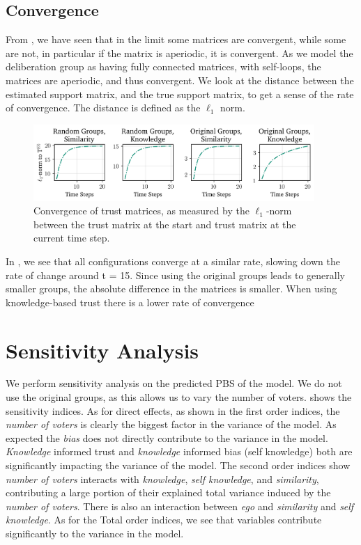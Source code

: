 \subsection{Convergence}

From , we have seen that in the limit some matrices are
convergent, while some are not, in particular if the matrix is aperiodic, it
is convergent. As we model the deliberation group as having fully connected
matrices, with self-loops, the matrices are aperiodic, and thus convergent. We look at the
distance between the estimated support matrix, and the true support matrix, to
get a sense of the rate of convergence. The distance is defined as the
$\ell_1$ norm.

\begin{figure}[ht]
	\begin{center}
		\includegraphics[width=0.95\textwidth]{Figures/convergence_groups.png}
	\end{center}
	\caption{Convergence of trust matrices, as measured by the $\ell_1$-norm between the trust matrix at the start and  trust matrix at the current time step.}\label{fig:convergence_big}
\end{figure}

In , we see that all configurations converge at a
similar rate, slowing down the rate of change around t = 15. Since using the
original groups leads to generally smaller groups, the absolute difference in
the matrices is smaller. When using knowledge-based trust there is a lower rate
of convergence




\section{Sensitivity Analysis} We perform sensitivity analysis on the predicted
PBS of the model. We do not use the original groups, as this allows us to vary
the number of voters.  shows the sensitivity indices.
As for direct effects, as shown in the first order indices, the \textit{number
of voters} is clearly the biggest factor in the variance of the model. As
expected the \textit{bias} does not directly contribute to the variance in the
model. \textit{Knowledge} informed trust and\textit{ knowledge} informed bias
(self knowledge) both are significantly impacting the variance of the model.
The second order indices show \textit{number of voters} interacts with
\textit{knowledge}, \textit{self knowledge}, and\textit{ similarity},
contributing a large portion of their explained total variance induced by the
\textit{number of voters}. There is also an interaction between \textit{ego}
and \textit{similarity} and \textit{self knowledge}. As for the Total order
indices, we see that variables contribute significantly to the variance in the
model.


